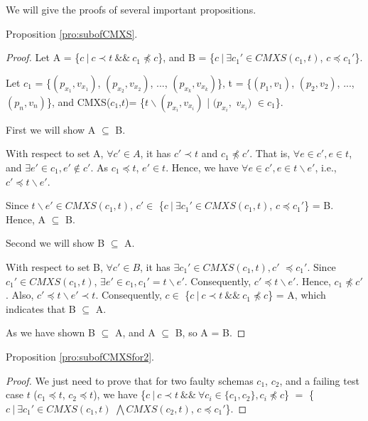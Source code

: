 {We will give the proofs of several important propositions.

Proposition \ref{pro:subofCMXS}.
\begin{proof}

Let A =  \{$c\ |\ c \prec t\ \&\&\ c_{1} \npreceq c$\}, and B = \{$ c\ |\ \exists c_{1}' \in CMXS(c_{1}, t)$, $c \preceq c_{1}'$\}.



Let $c_{1}$ = \{$(p_{x_{1}}, v_{x_{1}})$, $(p_{x_{2}}, v_{x_{2}})$, ..., $(p_{x_{k}}, v_{x_{k}})$\},  t = \{$(p_{1}, v_{1})$, $(p_{2}, v_{2})$, ..., $(p_{n}, v_{n})$\}, and CMXS($c_{1}$,$t$)= \{$t \backslash (p_{x_{i}}, v_{x_{i}})$ | $(p_{x_{i}},$ $v_{x_{i}})$ $ \in c_{1} $\}.

First we will show A $\subseteq$ B.

With respect to set A, $\forall c' \in A$, it has $c' \prec t$ and $ c_{1} \npreceq c'$. That is, $\forall e \in c', e \in t$, and  $\exists e' \in c_{1}, e' \not\in c'$. As $c_{1} \preceq t$, $e' \in t$. Hence, we have $\forall e \in c', e \in t \backslash e'$, i.e., $c' \preceq t \backslash e'$.

Since $t \backslash e' \in CMXS(c_{1}, t)$,  $c' \in $ \{$ c\ |\ \exists c_{1}' \in CMXS(c_{1}, t)$, $c \preceq c_{1}'$\} = B. Hence, A $\subseteq$ B.

Second we will show B $\subseteq$ A.

With respect to set B, $\forall c' \in B$, it has $\exists c_{1}' \in CMXS(c_{1}, t), c'$ $ \preceq c_{1}'$. Since $c_{1}' \in CMXS(c_{1}, t)$, $\exists e' \in c_{1}, c_{1}' =  t \backslash e'$. Consequently, $c' \preceq t \backslash e'$. Hence, $c_{1} \npreceq c'$. Also, $c' \preceq t \backslash e' \prec t$. Consequently, $c \in $  \{$c\ |\ c \prec t\ \&\&\ c_{1} \npreceq c$\} = A, which indicates that B $\subseteq$ A.

As we have shown B $\subseteq$ A, and A $\subseteq$ B, so A = B.

\end{proof}

Proposition \ref{pro:subofCMXSfor2}.
\begin{proof}

We just need to prove that for two faulty schemas $c_{1}$, $c_{2}$, and a failing test case $t$ ($c_{1} \preceq t$, $c_{2} \preceq t$), we have \{$c\ |\ c \prec t\ \&\&\ \forall c_{i} \in \{c_{1}, c_{2}\}, c_{i} \npreceq c $\} $=$  \{$ c\ |\ \exists c_{1}' \in CMXS(c_{1}, t)$ $\bigwedge CMXS(c_{2}, t)$, $c \preceq c_{1}'$\}.


\end{proof}}
